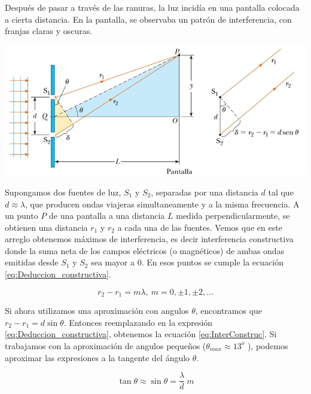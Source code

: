 \documentclass[a4paper,12pt]{article}
\newenvironment{Figure}
  {\par\medskip\noindent\minipage{\linewidth}}
  {\endminipage\par\medskip}
\begin{document}
    Después de pasar a través de las ranuras, la luz incidía en una pantalla colocada a cierta distancia. En la pantalla, se observaba un patrón de interferencia, con franjas claras y oscuras.

    \begin{Figure}
        \centering
        \includegraphics[width=0.75\linewidth]{DeduccionInterferencia.jpg}
        \label{fig:DeduccionInterferencia}
    \end{Figure}
    
    Supongamos dos fuentes de luz, $S_1$ y $S_2$, separadas por una distancia $d$ tal que $d \approx \lambda$, que producen ondas viajeras simultaneamente y a la misma frecuencia. A un punto $P$ de una pantalla a una distancia $L$ medida perpendicularmente, se obtienen una distancia $r_1$ y $r_2$ a cada una de las fuentes. Vemos que en este arreglo obtenemos máximos de interferencia, es decir interferencia constructiva donde la suma neta de los campos eléctricos (o magnéticos) de ambas ondas emitidas desde $S_1$ y $S_2$ sea mayor a 0. En esos puntos se cumple la ecuación \ref{eq:Deduccion_constructiva}.

    \begin{equation}
        r_2 - r_1 =  m\lambda,\ m=0,\pm1, \pm2,...
        \label{eq:Deduccion_constructiva}
    \end{equation}

    Si ahora utilizamos una aproximación con angulos $\theta$, encontramos que $ r_2 - r_1 = d \sin\theta $. Entonces reemplazando en la expresión \ref{eq:Deduccion_constructiva}, obtenemos la ecuación \ref{eq:InterConstruc}. Si trabajamos con la aproximación de angulos pequeños ($\theta_{max} \approx 13^o$ ), podemos aproximar las expresiones a la tangente del ángulo $\theta$.

    \begin{equation}
        \tan \theta \approx \sin \theta =  \frac{\lambda}{d}\ m
        \label{eq:InterConstruc}
    \end{equation}
\end{document}

